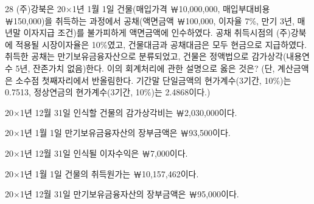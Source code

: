 \begin{question}{28}
(주)강북은 20×1년 1월 1일 건물(매입가격 ￦10,000,000, 매입부대비용 ￦150,000)을 취득하는 과정에서 공채(액면금액 ￦100,000, 이자율 7\%, 만기 3년, 매년말 이자지급 조건)를 불가피하게 액면금액에 인수하였다. 공채 취득시점의 (주)강북에 적용될 시장이자율은 10\%였고, 건물대금과 공채대금은 모두 현금으로 지급하였다. 취득한 공채는 만기보유금융자산으로 분류되었고, 건물은 정액법으로 감가상각(내용연수 5년, 잔존가치 없음)한다. 이의 회계처리에 관한 설명으로 옳은 것은? (단, 계산금액은 소수점 첫째자리에서 반올림한다. 기간말 단일금액의 현가계수(3기간, 10\%)는 0.7513, 정상연금의 현가계수(3기간, 10\%)는 2.4868이다.)
\begin{choices}
  \item 20×1년 12월 31일 인식할 건물의 감가상각비는 ￦2,030,000이다.
  \item 20×1년 1월 1일 만기보유금융자산의 장부금액은 ￦93,500이다.
  \item 20×1년 12월 31일 인식될 이자수익은 ￦7,000이다.
  \item 20×1년 1월 1일 건물의 취득원가는 ￦10,157,462이다.
  \item 20×1년 12월 31일 만기보유금융자산의 장부금액은 ￦95,000이다.
\end{choices}
\end{question}

